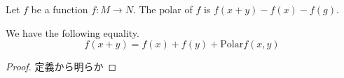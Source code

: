 %

\begin{definition}
  Let $f$ be a function $f : M \to N$. The polar of $f$ is $f(x + y) - f(x) - f(g)$.
\end{definition}

\begin{theorem}
  We have the following equality.
$$
  f(x + y) = f(x) + f(y) + \mathrm{Polar} f(x,y)
$$
\end{theorem}

\begin{proof}
  定義から明らか
\end{proof}
